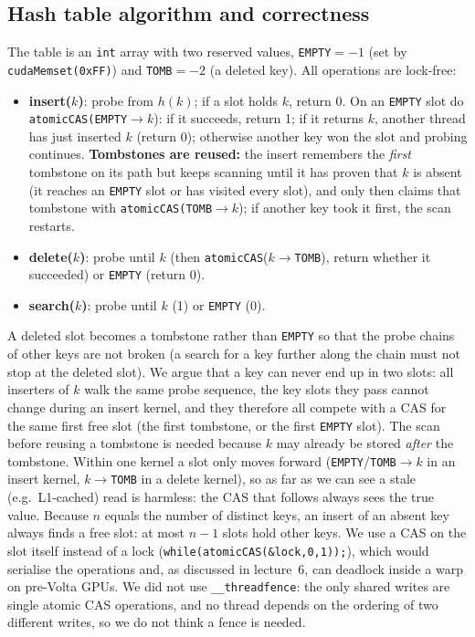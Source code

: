 \documentclass[10pt,a4paper]{article}
\begin{document}
\subsection{Hash table algorithm and correctness}\label{sec:q1alg}
The table is an \texttt{int} array with two reserved values,
\texttt{EMPTY}$=-1$ (set by \texttt{cudaMemset(0xFF)}) and
\texttt{TOMB}$=-2$ (a deleted key). All operations are lock-free:
\begin{itemize}
\item \textbf{insert($k$)}: probe from $h(k)$; if a slot holds $k$, return 0.
  On an \texttt{EMPTY} slot do \texttt{atomicCAS(EMPTY}$\to k$): if it
  succeeds, return 1; if it returns $k$, another thread has just inserted $k$
  (return 0); otherwise another key won the slot and probing continues.
  \textbf{Tombstones are reused:} the insert remembers the \emph{first} tombstone
  on its path but keeps scanning until it has proven that $k$ is absent (it reaches
  an \texttt{EMPTY} slot or has visited every slot), and only then claims that
  tombstone with \texttt{atomicCAS(TOMB}$\to k$); if another key took it first,
  the scan restarts.
\item \textbf{delete($k$)}: probe until $k$ (then \texttt{atomicCAS}($k\to$\texttt{TOMB}),
  return whether it succeeded) or \texttt{EMPTY} (return 0).
\item \textbf{search($k$)}: probe until $k$ (1) or \texttt{EMPTY} (0).
\end{itemize}
A deleted slot becomes a tombstone rather than \texttt{EMPTY} so that the probe
chains of other keys are not broken (a search for a key further along the chain
must not stop at the deleted slot). We argue that a key can never end up in two slots: all
inserters of $k$ walk the same probe sequence, the key slots they pass cannot
change during an insert kernel, and they therefore all compete with a CAS for
the same first free slot (the first tombstone, or the first \texttt{EMPTY} slot).
The scan before reusing a tombstone is needed because $k$ may already be
stored \emph{after} the tombstone. Within one kernel a slot only moves forward
(\texttt{EMPTY}/\texttt{TOMB}$\to k$ in an insert kernel, $k\to$\texttt{TOMB} in
a delete kernel), so as far as we can see a stale (e.g.\ L1-cached) read is
harmless: the CAS that follows always sees the true value. Because $n$ equals the number of distinct
keys, an insert of an absent key always finds a free slot: at most $n-1$ slots
hold other keys. We use a CAS on the slot itself instead of a lock
(\texttt{while(atomicCAS(\&lock,0,1));}), which would serialise the operations
and, as discussed in lecture~6, can deadlock inside a warp on pre-Volta GPUs. We did
not use \texttt{\_\_threadfence}: the only shared writes are single atomic CAS
operations, and no thread depends on the ordering of two different writes, so we do
not think a fence is needed.
\end{document}

